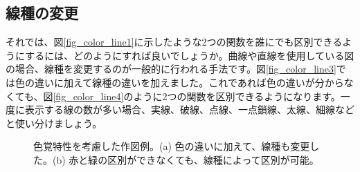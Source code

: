 \subsection{線種の変更}
それでは、図\ref{fig_color_line1}に示したような2つの関数を誰にでも区別できるようにするには、どのようにすれば良いでしょうか。曲線や直線を使用している図の場合、線種を変更するのが一般的に行われる手法です。図\ref{fig_color_line3}では色の違いに加えて線種の違いを加えました。これであれば色の違いが分からなくても、図\ref{fig_color_line4}のように2つの関数を区別できるようになります。一度に表示する線の数が多い場合、実線、破線、点線、一点鎖線、太線、細線などと使い分けましょう。

\begin{figure}
  \centering
  \caption[色覚特性を考慮した作図例]{色覚特性を考慮した作図例。(a) 色の違いに加えて、線種も変更した。(b) 赤と緑の区別ができなくても、線種によって区別が可能。}
\end{figure}

